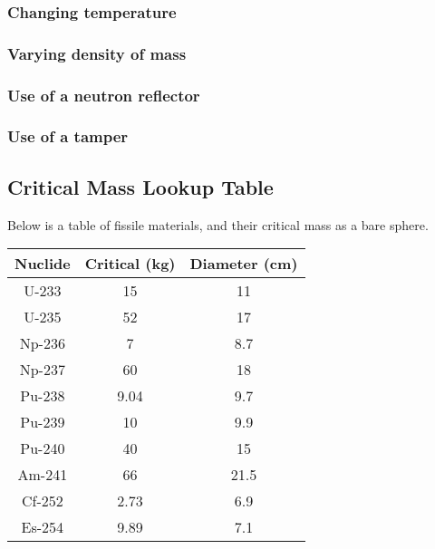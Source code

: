 \documentclass{article}
\begin{document}
\begin{multicols*}{2}
    \subsubsection*{Changing temperature}
    \subsubsection*{Varying density of mass}
    \subsubsection*{Use of a neutron reflector}
    \subsubsection*{Use of a tamper}

    \subsection{Critical Mass Lookup Table}
    Below is a table of fissile materials, and their critical mass as a bare sphere.\\
    \begin{tabular}{|c|c|c|}
      \hline
      Nuclide & Critical (kg) & Diameter (cm) \\
      \hline
      U-233  & 15  & 11  \\
      U-235  & 52  & 17  \\
      Np-236 & 7   & 8.7 \\
      Np-237 & 60  & 18  \\
      Pu-238 & 9.04& 9.7 \\
      Pu-239 & 10  & 9.9 \\
      Pu-240 & 40  & 15  \\
      Am-241 & 66  & 21.5\\
      Cf-252 & 2.73& 6.9 \\
      Es-254 & 9.89& 7.1 \\
      \hline
    \end{tabular}

    

  \end{multicols*}
\end{document}
